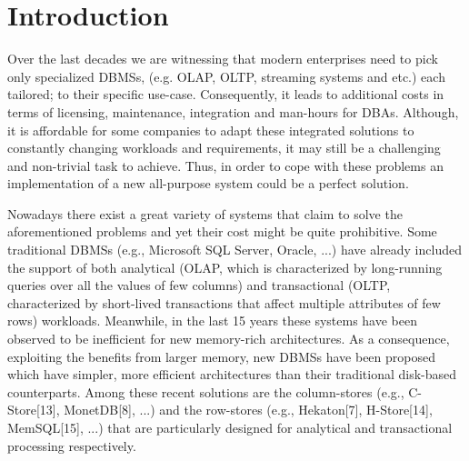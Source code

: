 \documentclass[10pt, conference, compsocconf]{IEEEtran}
\begin{document}
\section{Introduction}
Over the last decades we are witnessing that modern enterprises need to pick only specialized DBMSs, (e.g. OLAP, OLTP, streaming systems and etc.) each tailored; to their specific use-case. Consequently, it leads to additional costs in terms of licensing, maintenance, integration and man-hours for DBAs. Although, it is affordable for some companies to adapt these integrated solutions to constantly changing workloads and requirements, it may still be a challenging and non-trivial task to achieve. Thus, in order to cope with these problems an implementation of a new all-purpose system could be a perfect solution. 

Nowadays there exist a great variety of systems that claim to solve the aforementioned problems and yet their cost might be quite prohibitive. Some traditional DBMSs (e.g., Microsoft SQL Server, Oracle, ...) have already included the support of both analytical (OLAP, which is characterized by long-running queries over all the values of few columns) and transactional (OLTP, characterized by short-lived transactions that affect multiple attributes of few rows) workloads. Meanwhile, in the last 15 years these systems have been observed to be inefficient for new memory-rich architectures. As a consequence, exploiting the benefits from larger memory, new DBMSs have been proposed which have simpler, more efficient architectures than their traditional disk-based counterparts. Among these recent solutions are the column-stores (e.g., C-Store[13], MonetDB[8], ...) and the row-stores (e.g., Hekaton[7], H-Store[14], MemSQL[15], ...) that are particularly designed for analytical and transactional processing respectively. 
\end{document}
